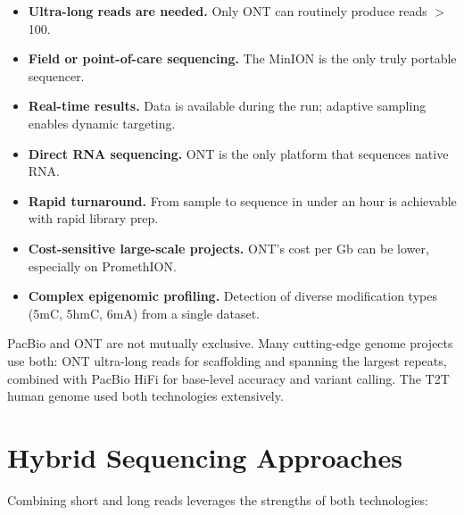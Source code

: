 \begin{itemize}[nosep]
  \item \textbf{Ultra-long reads are needed.} Only ONT can routinely produce reads $>$100\kilobase.
  \item \textbf{Field or point-of-care sequencing.} The MinION is the only truly portable sequencer.
  \item \textbf{Real-time results.} Data is available during the run; adaptive sampling enables dynamic targeting.
  \item \textbf{Direct RNA sequencing.} ONT is the only platform that sequences native RNA.
  \item \textbf{Rapid turnaround.} From sample to sequence in under an hour is achievable with rapid library prep.
  \item \textbf{Cost-sensitive large-scale projects.} ONT's cost per Gb can be lower, especially on PromethION.
  \item \textbf{Complex epigenomic profiling.} Detection of diverse modification types (5mC, 5hmC, 6mA) from a single dataset.
\end{itemize}

\begin{tipbox}[title={Complementary Technologies}]
PacBio and ONT are not mutually exclusive. Many cutting-edge genome projects use both: ONT ultra-long reads for scaffolding and spanning the largest repeats, combined with PacBio HiFi for base-level accuracy and variant calling. The T2T human genome used both technologies extensively.
\end{tipbox}


\section{Hybrid Sequencing Approaches}
\label{sec:hybrid}

Combining short and long reads leverages the strengths of both technologies:

